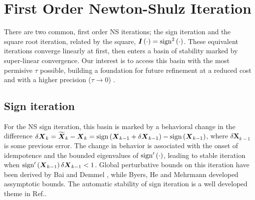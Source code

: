 \documentclass[letterpaper,twocolumn,amsmath,amsfont,amssymb,english,aps,jcp,preprintnumbers,groupaddress,nofootinbib,tightenlines]{revtex4}
\newcommand{\mat}[1]{\boldsymbol{#1}}
\begin{document}
\section{First Order Newton-Shulz Iteration}

There are two common, first order NS iterations; the sign iteration and the square root iteration, related by the square, $\mat{I}\left( \cdot \right)= {\rm sign}^2\left( \cdot \right) $.  These equivalent iterations converge linearly at first, then enters a basin of stability marked by super-linear convergence.
Our interest is to access this basin with the most permisive $\tau$ possible, building a foundation for future refinement
at a reduced cost and with a higher precision ($\tau \rightarrow 0$) \cite{MChallacombe16}.

\subsection{Sign iteration}
For the NS sign iteration, this basin is marked by a behavioral change in the
difference $\delta \mat{X}_k = \widetilde{\mat{X}}_k -\mat{X}_k = {\rm sign} \left(\mat{X}_{k-1}+\delta \mat{X}_{k-1} \right)
-{\rm sign} \left(\mat{X}_{k-1} \right)$, where $\delta \mat{X}_{k-1}$ is some previous error.
The change in behavior is associated with the onset of idempotence and the bounded eigenvalues of ${\rm sign}'\left( \cdot \right)$, leading to stable
iteration when ${\rm sign}'\left( \mat{X}_{k-1} \right) \delta \mat{X}_{k-1} < 1 $.
Global perturbative bounds on this iteration have been derived by Bai and Demmel \cite{Bai98usingthe}, while
Byers, He and Mehrmann \cite{} developed assymptotic bounds.  The automatic stability of sign iteration is a well developed theme in Ref.\cite{Higham08}.
\end{document}

